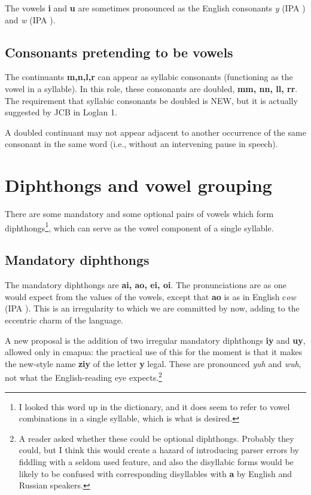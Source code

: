 \documentclass[12pt]{book}
\begin{document}
The vowels {\bf i} and {\bf u} are sometimes pronounced as the English consonants {\em y} (IPA ) and {\em w} (IPA ).

\subsection{Consonants pretending to be vowels}

The continuants {\bf m,n,l,r} can appear as syllabic consonants (functioning as the vowel in a syllable).  In this role, these consonants are doubled,
{\bf mm, nn, ll, rr}.  The requirement that syllabic consonants be doubled is NEW, but it is actually suggested by JCB in Loglan 1.

A doubled continuant may not appear adjacent to another occurrence of the same consonant in the same word (i.e., without an intervening pause in speech).

\section{Diphthongs and vowel grouping}

There are some mandatory and some optional pairs of vowels which form diphthongs\footnote{I looked this word up in the dictionary, and it does seem to refer to vowel combinations in a single syllable, which is what is desired.}, which can serve as the vowel component of a single syllable.

\subsection{Mandatory diphthongs}

The mandatory diphthongs are {\bf ai, ao, ei, oi}.  The pronunciations are as one would expect from the values of the vowels, except that
{\bf ao} is as in English c{\em ow} (IPA ).  This is an irregularity to which we are committed by now, adding to the eccentric charm of the language.

A new proposal is the addition of two irregular mandatory diphthongs {\bf iy} and {\bf uy}, allowed only in cmapua:  the practical use of this
for the moment is that it makes the new-style name {\bf ziy} of the letter {\bf y} legal.  These are pronounced {\em yuh\/} and
{\em wuh\/}, not what the English-reading  eye expects.\footnote{A reader asked whether these could be optional diphthongs.  Probably they could, but I think this would create a hazard of introducing parser errors by fiddling with a seldom used feature, and also the disyllabic forms would be likely to be confused with corresponding disyllables with {\bf a} by English and Russian speakers.}
\end{document}
